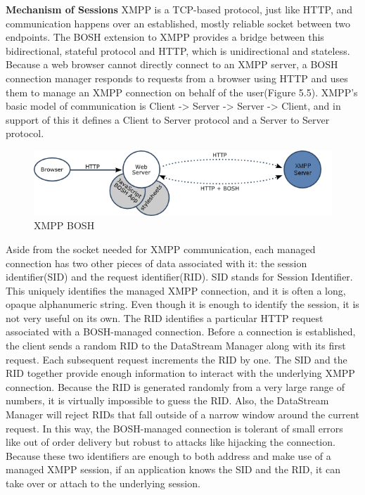 \textbf{Mechanism of Sessions}
\newline
XMPP is a TCP-based protocol, just like HTTP, and communication happens over an established, mostly reliable socket between two endpoints. The BOSH extension to XMPP provides a bridge between this bidirectional, stateful protocol and HTTP, which is unidirectional and stateless. Because a web browser cannot directly connect to an XMPP server, a BOSH connection manager responds to requests from a browser using HTTP and uses them to manage an XMPP connection on behalf of the user(Figure 5.5).  XMPP's basic model of communication is Client -> Server -> Server -> Client, and in support of this it defines a Client to Server protocol and a Server to Server protocol.
  \begin{figure}[!ht]
  \centering
  \includegraphics[scale=0.6]{images/xmpp-bosh.png}   
  \caption[BOSH]{XMPP BOSH}                         
  \end{figure} 

Aside from the socket needed for XMPP communication, each managed connection has two other pieces of data associated with it: the session identifier(SID) and the request identifier(RID). SID stands for Session Identifier. This uniquely identifies the managed XMPP connection, and it is often a long, opaque alphanumeric string. Even though it is enough to identify the session, it is not very useful on its own. The RID identifies a particular HTTP request associated with a BOSH-managed connection. Before a connection is established, the client sends a random RID to the DataStream Manager along with its first request. Each subsequent request increments the RID by one. The SID and the RID together provide enough information to interact with the underlying XMPP connection. Because the RID is generated randomly from a very large range of numbers, it is virtually impossible to guess the RID. Also, the DataStream Manager will reject RIDs that fall outside of a narrow window around the current request. In this way, the BOSH-managed connection is tolerant of small errors like out of order delivery but robust to attacks like hijacking the connection. Because these two identifiers are enough to both address and make use of a managed XMPP session, if an application knows the SID and the RID, it can take over or attach to the underlying session.

